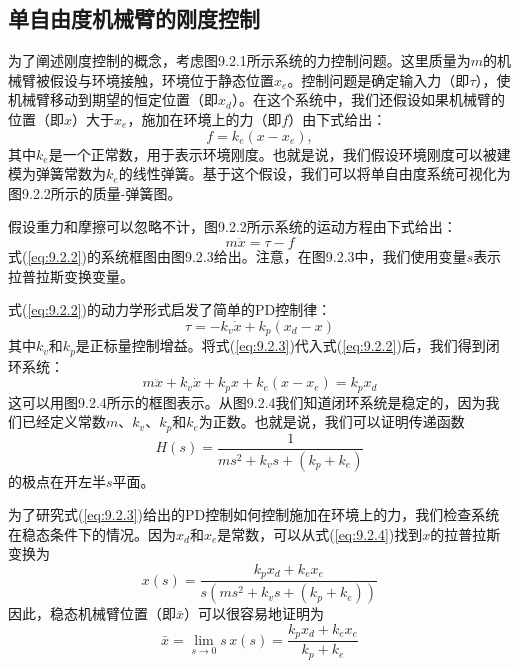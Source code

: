 \documentclass[12pt,a4paper]{ctexart}
\begin{document}
\subsection{单自由度机械臂的刚度控制}

为了阐述刚度控制的概念，考虑图9.2.1所示系统的力控制问题。这里质量为$m$的机械臂被假设与环境接触，环境位于静态位置$x_e$。控制问题是确定输入力（即$\tau$），使机械臂移动到期望的恒定位置（即$x_d$）。在这个系统中，我们还假设如果机械臂的位置（即$x$）大于$x_e$，施加在环境上的力（即$f$）由下式给出：
\begin{equation}\label{eq:9.2.1}
f = k_e(x - x_e),
\end{equation}
其中$k_e$是一个正常数，用于表示环境刚度。也就是说，我们假设环境刚度可以被建模为弹簧常数为$k_e$的线性弹簧。基于这个假设，我们可以将单自由度系统可视化为图9.2.2所示的质量-弹簧图。

假设重力和摩擦可以忽略不计，图9.2.2所示系统的运动方程由下式给出：
\begin{equation}\label{eq:9.2.2}
m\ddot{x} = \tau - f
\end{equation}
式(\ref{eq:9.2.2})的系统框图由图9.2.3给出。注意，在图9.2.3中，我们使用变量$s$表示拉普拉斯变换变量。

式(\ref{eq:9.2.2})的动力学形式启发了简单的PD控制律：
\begin{equation}\label{eq:9.2.3}
\tau = -k_v\dot{x} + k_p(x_d - x)
\end{equation}
其中$k_v$和$k_p$是正标量控制增益。将式(\ref{eq:9.2.3})代入式(\ref{eq:9.2.2})后，我们得到闭环系统：
\begin{equation}\label{eq:9.2.4}
m\ddot{x} + k_v\dot{x} + k_p x + k_e(x - x_e) = k_p x_d
\end{equation}
这可以用图9.2.4所示的框图表示。从图9.2.4我们知道闭环系统是稳定的，因为我们已经定义常数$m$、$k_v$、$k_p$和$k_e$为正数。也就是说，我们可以证明传递函数
\begin{equation}\label{eq:9.2.transfer}
H(s) = \frac{1}{ms^2 + k_v s + (k_p + k_e)}
\end{equation}
的极点在开左半$s$平面。

为了研究式(\ref{eq:9.2.3})给出的PD控制如何控制施加在环境上的力，我们检查系统在稳态条件下的情况。因为$x_d$和$x_e$是常数，可以从式(\ref{eq:9.2.4})找到$x$的拉普拉斯变换为
\begin{equation}\label{eq:9.2.5}
x(s) = \frac{k_p x_d + k_e x_e}{s(ms^2 + k_v s + (k_p + k_e))}
\end{equation}
因此，稳态机械臂位置（即$\bar{x}$）可以很容易地证明为
\begin{equation}\label{eq:9.2.6}
\bar{x} = \lim_{s \to 0} s\,x(s) = \frac{k_p x_d + k_e x_e}{k_p + k_e}
\end{equation}
\end{document}
